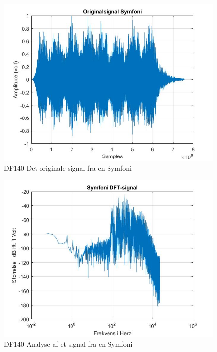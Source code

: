 \begin{figure}[H]
	\centering
	\includegraphics[width=140mm]{figures/Symfoni/original.jpg}
	\caption{DF140 Det originale signal fra en Symfoni}
	\label{fig:Symfoni original}
\end{figure}

\begin{figure}[H]
	\centering
	\includegraphics[width=140mm]{figures/Symfoni/DFT.jpg}
	\caption{DF140 Analyse af et signal fra en Symfoni}
	\label{fig:Symfoni DF140}
\end{figure}

